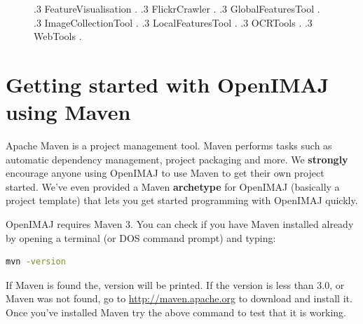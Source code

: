 \documentclass[10pt,a4paper,twoside,extrafontsizes]{memoir}
\begin{document}
\begin{figure}[h!]
{.3 FeatureVisualisation .
.3 FlickrCrawler .
.3 GlobalFeaturesTool .
.3 ImageCollectionTool .
.3 LocalFeaturesTool .
.3 OCRTools .
.3 WebTools .
}
\end{figure}

\chapter{Getting started with OpenIMAJ using Maven}
\pagestyle{headings}
Apache Maven is a project management tool.  Maven performs tasks such 
as automatic  dependency management, project packaging and more. We \textbf{strongly} 
encourage anyone using OpenIMAJ to use Maven to get their own project started. 
We've even provided a Maven \textbf{archetype} for OpenIMAJ (basically a project template) 
that lets you get started programming with OpenIMAJ quickly. 

OpenIMAJ requires Maven 3. You can check if you have Maven installed already 
by opening a terminal (or DOS command prompt) and typing:
\begin{lstlisting}[language=bash]
mvn -version
\end{lstlisting}
If Maven is found the, version will be printed. If the version is less than 3.0, 
or Maven was not found, go to \url{http://maven.apache.org} to download and 
install it. Once you've installed Maven try the above command to test that it 
is working.
\end{document}

